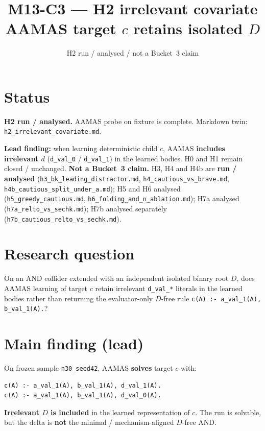 \documentclass[11pt]{article}
\title{M13-C3 --- H2 irrelevant covariate\\
AAMAS target \(c\) retains isolated \(D\)}
\author{}
\date{H2 run / analysed / not a Bucket~3 claim}
\begin{document}
\maketitle

\section{Status}

\textbf{H2 run / analysed.}
AAMAS probe on fixture  is complete.
Markdown twin: \texttt{h2\_irrelevant\_covariate.md}.

\textbf{Lead finding:} when learning deterministic child \(c\), AAMAS
\textbf{includes irrelevant \(d\)} (\texttt{d\_val\_0} / \texttt{d\_val\_1}) in
the learned bodies.
H0 and H1 remain closed / unchanged.
\textbf{Not a Bucket~3 claim.}
H3, H4 and H4b are \textbf{run / analysed}
(\texttt{h3\_bk\_leading\_distractor.md},
\texttt{h4\_cautious\_vs\_brave.md},
\texttt{h4b\_cautious\_split\_under\_a.md});
H5 and H6 analysed (\texttt{h5\_greedy\_cautious.md},
\texttt{h6\_folding\_and\_n\_ablation.md}); H7a analysed
(\texttt{h7a\_relto\_vs\_sechk.md}); H7b analysed separately
(\texttt{h7b\_cautious\_relto\_vs\_sechk.md}).

\section{Research question}

On an AND collider extended with an independent isolated binary root \(D\),
does AAMAS learning of target \(c\) retain irrelevant \texttt{d\_val\_*}
literals in the learned bodies rather than returning the evaluator-only
\(D\)-free rule \texttt{c(A) :- a\_val\_1(A), b\_val\_1(A).}?

\section{Main finding (lead)}

On frozen sample \texttt{n30\_seed42}, AAMAS \textbf{solves} target \(c\) with:
\begin{verbatim}
c(A) :- a_val_1(A), b_val_1(A), d_val_1(A).
c(A) :- a_val_1(A), b_val_1(A), d_val_0(A).
\end{verbatim}

\textbf{Irrelevant \(D\) is included} in the learned representation of \(c\).
The run is solvable, but the delta is \textbf{not} the minimal /
mechanism-aligned \(D\)-free AND.
\end{document}
